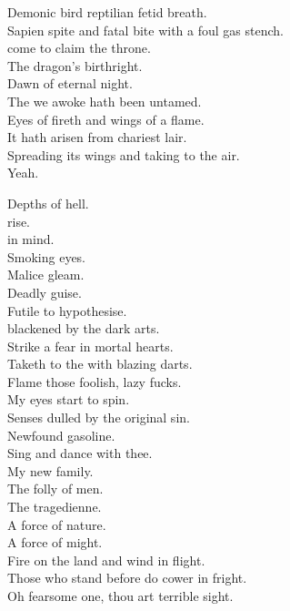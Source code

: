 Demonic bird reptilian  fetid breath. \\
Sapien spite and fatal bite with a foul gas stench. \\
 come to claim the throne. \\
The dragon's birthright. \\
Dawn of eternal night. \\

The  we awoke hath been untamed. \\
Eyes of fireth and wings of a flame. \\
It hath arisen from chariest lair. \\
Spreading its wings and taking to the air. \\

Yeah. \\



Depths of hell. \\
 rise. \\
 in mind. \\
Smoking eyes. \\
Malice gleam. \\
Deadly guise. \\
Futile to hypothesise. \\
 blackened by the dark arts. \\
Strike a fear in mortal hearts. \\
Taketh to the  with blazing darts. \\
Flame those foolish, lazy fucks. \\

My eyes start to spin. \\
Senses dulled by the original sin. \\
Newfound gasoline. \\
Sing and dance with thee. \\
My new family. \\
The folly of men. \\
The tragedienne. \\
A force of nature. \\
A force of might. \\
Fire on the land and wind in flight. \\
Those who stand before do cower in fright. \\
Oh fearsome one, thou art terrible sight. \\

